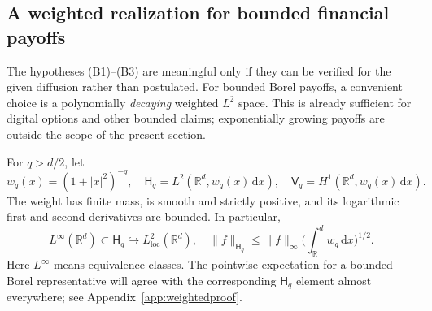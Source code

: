 \documentclass[11pt,a4paper]{article}
\theoremstyle{definition}\newtheorem{definition}{Definition}[section]\newtheorem{example}[theorem]{Example}
\theoremstyle{remark}\newtheorem{remark}[theorem]{Remark}\newtheorem{remarkSix}{Remark}[section]
\newcommand{\Rd}{\mathbb R^d}
\newcommand{\loc}{\mathrm{loc}}
\newcommand{\dd}{\,\mathrm d}
\newcommand{\norm}[1]{\lVert #1\rVert}
\newcommand{\HH}{\mathsf H_q}
\newcommand{\VV}{\mathsf V_q}
\begin{document}
\subsection{A weighted realization for bounded financial payoffs}
\label{subsec:weightedB}
The hypotheses (B1)--(B3) are meaningful only if they can be verified for the given diffusion rather than postulated. For bounded Borel payoffs, a convenient choice is a polynomially \emph{decaying} weighted $L^2$ space. This is already sufficient for digital options and other bounded claims; exponentially growing payoffs are outside the scope of the present section.

For $q>d/2$, let
\begin{equation}\label{eq:weightB}
 w_q(x)=(1+|x|^2)^{-q},\quad
 \HH=L^2(\Rd,w_q(x)\dd x),\quad
 \VV=H^1(\Rd,w_q(x)\dd x).
\end{equation}
The weight has finite mass, is smooth and strictly positive, and its logarithmic first and second derivatives are bounded. In particular,
\begin{equation}\label{eq:boundedpayoffB}
 L^\infty(\Rd)\subset\HH\hookrightarrow L^2_{\loc}(\Rd),
 \quad \norm f_{\HH}\le\norm f_\infty\Big(\int_\Rd w_q\dd x\Big)^{1/2}.
\end{equation}
Here $L^\infty$ means equivalence classes. The pointwise expectation for a bounded Borel representative will agree with the corresponding $\HH$ element almost everywhere; see Appendix~\ref{app:weightedproof}.
\end{document}

